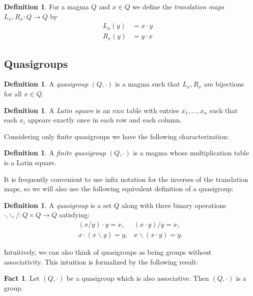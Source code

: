 \documentclass[12pt]{report}
\theoremstyle{definition}
\newtheorem{fct}[thm]{Fact}
\newtheorem{dfn}[thm]{Definition}
\newcommand{\ldv}{\backslash}       %
\newcommand{\rdv}{/}                %
\begin{document}
\begin{dfn}
  For a magma $Q$ and $x\in Q$ we define the \emph{translation maps} $L_x, R_x:Q\to Q$ by
  \begin{align*}
    L_x(y) &= x\cdot y\\
    R_x(y) &= y\cdot x
  \end{align*}
\end{dfn}

\subsection{Quasigroups}

\begin{dfn}
  A \emph{quasigroup} $(Q, \cdot)$ is a magma such that $L_x, R_x$ are bijections for all $x\in Q$.
\end{dfn}

\begin{dfn}
  A \emph{Latin square} is an $n$x$n$ table with entries $x_1, \ldots, x_n$ such that each $x_i$ appears exactly once
    in each row and each column.
\end{dfn}

Considering only finite quasigroups we have the following characterization:

\begin{dfn}
  A \emph{finite quasigroup} $(Q, \cdot)$ is a magma whose multiplication table is a Latin square.
\end{dfn}

It is frequently convenient to use infix notation for the inverses of the translation maps, so we will also use the
  following equivalent definition of a quasigroup:

\begin{dfn}
  A \emph{quasigroup} is a set $Q$ along with three binary operations $\cdot, \ldv, \rdv:Q\times Q\to Q$ satisfying:
  \begin{align*}
    &(x\rdv y)\cdot y = x, &(x\cdot y)\rdv y = x,\\
    &x\cdot (x\ldv y) = y, &x\ldv (x\cdot y) = y.
  \end{align*}
\end{dfn}

Intuitively, we can also think of quasigroups as being groups without associativity. This intuition is formalized by
  the following result:

\begin{fct}
  Let $(Q, \cdot)$ be a quasigroup which is also associative. Then $(Q, \cdot)$ is a group.
\end{fct}
\end{document}
